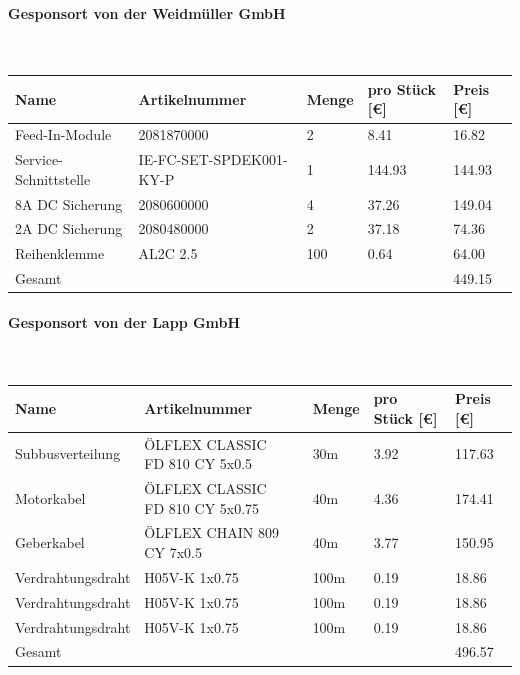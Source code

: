 \paragraph{Gesponsort von der Weidmüller GmbH}\mbox{}\\
\begin{table}[H]
    \begin{tabular}{lllll}
    Name                & Artikelnummer                          & Menge & pro Stück {[}€{]} & Preis {[}€{]} \\ \hline
    Feed-In-Module      & 2081870000                             & 2     & 8.41              & 16.82         \\
    Service-Schnittstelle & IE-FC-SET-SPDEK001-KY-P               & 1     & 144.93            & 144.93        \\
    8A DC Sicherung     & 2080600000                             & 4     & 37.26             & 149.04        \\
    2A DC Sicherung     & 2080480000                             & 2     & 37.18             & 74.36         \\
    Reihenklemme        & AL2C 2.5                               & 100   & 0.64              & 64.00         \\ \hline
    Gesamt              &                                        &       &                   & 449.15       
    \end{tabular}
\end{table}
\paragraph{Gesponsort von der Lapp GmbH}\mbox{}\\
\begin{table}[H]
    \begin{tabular}{lllll}
    Name                & Artikelnummer                          & Menge & pro Stück {[}€{]} & Preis {[}€{]} \\ \hline
    Subbusverteilung    & \makecell[l]{ÖLFLEX CLASSIC \\FD 810 CY 5x0.5 }        & 30m   & 3.92              & 117.63        \\
    Motorkabel          & \makecell[l]{ÖLFLEX CLASSIC \\FD 810 CY 5x0.75 }     & 40m   & 4.36              & 174.41        \\
    Geberkabel             & ÖLFLEX CHAIN 809 CY 7x0.5              & 40m   & 3.77              & 150.95        \\
    Verdrahtungsdraht   & H05V-K 1x0.75                          & 100m  & 0.19              & 18.86         \\
    Verdrahtungsdraht   & H05V-K 1x0.75                          & 100m  & 0.19              & 18.86         \\
    Verdrahtungsdraht   & H05V-K 1x0.75                          & 100m  & 0.19              & 18.86         \\ \hline
    Gesamt              &                                        &       &                   & 496.57       
    \end{tabular}
\end{table}
